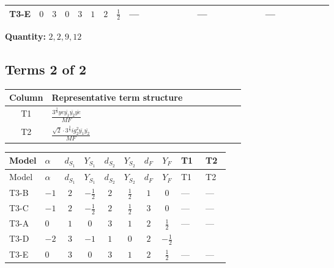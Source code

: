 \documentclass[8pt]{article}
\begin{document}
\begin{landscape}
\begin{longtable}{@{}llcccccc >{\raggedright\arraybackslash}p{0.21\linewidth} >{\raggedright\arraybackslash}p{0.21\linewidth} >{\raggedright\arraybackslash}p{0.21\linewidth}@{}}
\midrule
T3-E & $0$ & $3$ & $0$ & $3$ & $1$ & $2$ & $\frac{1}{2}$ & --- & --- & --- \\
\midrule
\bottomrule
\end{longtable}
\clearpage
\noindent\textbf{Quantity: }$\mathrm{2,2,9,12}$\par\smallskip
\subsection*{Terms 2 of 2}
\begin{center}
\begin{tabular}{@{}c >{\raggedright\arraybackslash}p{0.82\linewidth}@{}}
\toprule
Column & Representative term structure \\
\midrule
T1 & \(\displaystyle \frac{3^{\frac{3}{4}} ye \overline{y_{1}} \overline{y_{2}} \overline{ye}}{MF}\) \\
\midrule
T2 & \(\displaystyle \frac{\sqrt{2} \cdot 3^{\frac{3}{4}} i g_{2}^{2} \overline{y_{1}} \overline{y_{2}}}{MF}\) \\
\midrule
\bottomrule
\end{tabular}
\end{center}
\smallskip
\tiny
\begin{longtable}{@{}llcccccc >{\raggedright\arraybackslash}p{0.21\linewidth} >{\raggedright\arraybackslash}p{0.21\linewidth}@{}}
\toprule
Model & $\alpha$ & $d_{S_1}$ & $Y_{S_1}$ & $d_{S_2}$ & $Y_{S_2}$ & $d_F$ & $Y_F$ & T1 & T2 \\
\midrule
\endfirsthead
\toprule
Model & $\alpha$ & $d_{S_1}$ & $Y_{S_1}$ & $d_{S_2}$ & $Y_{S_2}$ & $d_F$ & $Y_F$ & T1 & T2 \\
\midrule
\endhead
T3-B & $-1$ & $2$ & $-\frac{1}{2}$ & $2$ & $\frac{1}{2}$ & $1$ & $0$ & --- & --- \\
\midrule
T3-C & $-1$ & $2$ & $-\frac{1}{2}$ & $2$ & $\frac{1}{2}$ & $3$ & $0$ & --- & --- \\
\midrule
T3-A & $0$ & $1$ & $0$ & $3$ & $1$ & $2$ & $\frac{1}{2}$ & --- & --- \\
\midrule
T3-D & $-2$ & $3$ & $-1$ & $1$ & $0$ & $2$ & $-\frac{1}{2}$ & \scriptsize\adjustbox{max width=\linewidth}{$\begin{gathered} - \frac{3^{\frac{3}{4}} ye \overline{y_{1}} \overline{y_{2}} \overline{ye}}{12 MF}\end{gathered}$} & \scriptsize\adjustbox{max width=\linewidth}{$\begin{gathered} - \frac{\sqrt{2} \cdot 3^{\frac{3}{4}} i g_{2}^{2} \overline{y_{1}} \overline{y_{2}}}{3 MF}\end{gathered}$} \\
\midrule
T3-E & $0$ & $3$ & $0$ & $3$ & $1$ & $2$ & $\frac{1}{2}$ & --- & --- \\
\midrule
\bottomrule
\end{longtable}
\clearpage

\end{landscape}
\end{document}
